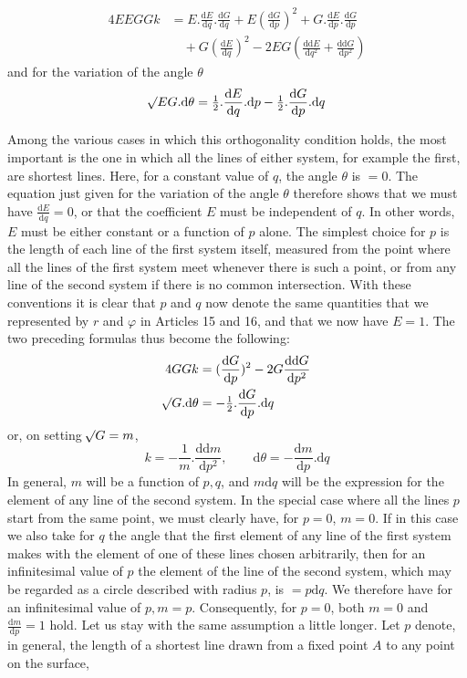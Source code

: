 %
\[
\begin{aligned}
4EEGGk&=E\mathord{.}\frac{\mathrm{d}E}{\mathrm{d}q}\mathord{.}\frac{\mathrm{d}G}{\mathrm{d}q}+E(\frac{\mathrm{d}G}{\mathrm{d}p})^2+G\mathord{.}\frac{\mathrm{d}E}{\mathrm{d}p}\mathord{.}\frac{\mathrm{d}G}{\mathrm{d}p}\\
&\quad+G(\frac{\mathrm{d}E}{\mathrm{d}q})^2-2EG(\frac{\mathrm{d}\mathrm{d}E}{\mathrm{d}q^2}+\frac{\mathrm{d}\mathrm{d}G}{\mathrm{d}p^2})
\end{aligned}
\]
and for the variation of the angle \(\theta\)
\[
\mathord{{}^{}\!\surd}EG\mathord{.}\mathrm{d}\theta=\tfrac{1}{2}\mathord{.}\frac{\mathrm{d}E}{\mathrm{d}q}\mathord{.}\mathrm{d}p-\tfrac{1}{2}\mathord{.}\frac{\mathrm{d}G}{\mathrm{d}p}\mathord{.}\mathrm{d}q
\]
\par\indent Among the various cases in which this orthogonality condition holds, the most important is the one in which all the lines of either system, for example the first, are shortest lines. Here, for a constant value of \(q\), the angle \(\theta\) is \(=0\). The equation just given for the variation of the angle \(\theta\) therefore shows that we must have \(\frac{\mathrm{d}E}{\mathrm{d}q}=0\), or that the coefficient \(E\) must be independent of \(q\). In other words, \(E\) must be either constant or a function of \(p\) alone. The simplest choice for \(p\) is the length of each line of the first system itself, measured from the point where all the lines of the first system meet whenever there is such a point, or from any line of the second system if there is no common intersection. With these conventions it is clear that \(p\) and \(q\) now denote the same quantities that we represented by \(r\) and \(\varphi\) in Articles 15 and 16, and that we now have \(E=1\). The two preceding formulas thus become the following:
\[
\begin{aligned}
4GGk&=(\frac{\mathrm{d}G}{\mathrm{d}p})^2-2G\frac{\mathrm{d}\mathrm{d}G}{\mathrm{d}p^2}\\
\mathord{{}^{}\!\surd}G\mathord{.}\mathrm{d}\theta&=-\tfrac{1}{2}\mathord{.}\frac{\mathrm{d}G}{\mathrm{d}p}\mathord{.}\mathrm{d}q
\end{aligned}
\]
or, on setting \(\mathord{{}^{}\!\surd}G=m\),
\[
k=-\frac{1}{m}\mathord{.}\frac{\mathrm{d}\mathrm{d}m}{\mathrm{d}p^2},\qquad\mathrm{d}\theta=-\frac{\mathrm{d}m}{\mathrm{d}p}\mathord{.}\mathrm{d}q
\]
In general, \(m\) will be a function of \(p,q\), and \(m\mathrm{d}q\) will be the expression for the element of any line of the second system. In the special case where all the lines \(p\) start from the same point, we must clearly have, for \(p=0\), \(m=0\). If in this case we also take for \(q\) the angle that the first element of any line of the first system makes with the element of one of these lines chosen arbitrarily, then for an infinitesimal value of \(p\) the element of the line of the second system, which may be regarded as a circle described with radius \(p\), is \(=p\mathrm{d}q\). We therefore have for an infinitesimal value of \(p,m=p\). Consequently, for \(p=0\), both \(m=0\) and \(\frac{\mathrm{d}m}{\mathrm{d}p}=1\) hold.
Let us stay with the same assumption a little longer. Let \(p\) denote, in general, the length of a shortest line drawn from a fixed point \(A\) to any point on the surface,
